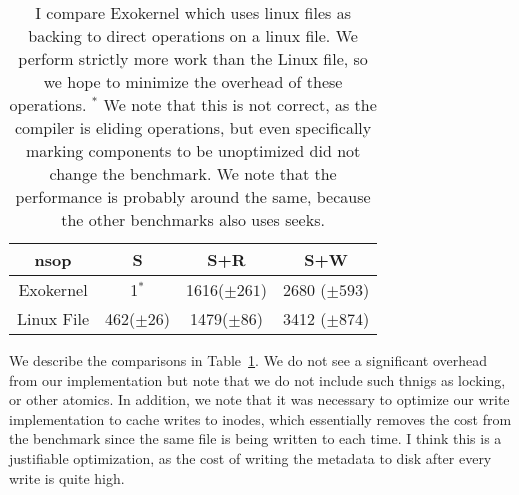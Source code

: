 \documentclass[letterpaper,twocolumn,10pt]{article}
\begin{document}
\begin{table}[t]
  \centering
  \begin{tabular}{|c|c|c|c|}
    ns\/op      & S      & S+R  & S+W \\
    \hline
    Exokernel  & 1$^{*}$& 1616($\pm 261$) & 2680 ($\pm 593$) \\
    \hline
    Linux File & 462($\pm 26$)    & 1479($\pm 86$) & 3412 ($\pm 874$) \\
  \end{tabular}
  \caption{
    \label{tab:cmp}
    I compare Exokernel which uses linux files as backing to direct operations on a linux file.
    We perform strictly more work than the Linux file, so we hope to minimize the overhead of
    these operations. $^*$ We note that this is not correct, as the compiler is
    eliding operations, but even specifically marking components to be unoptimized did not
    change the benchmark. We note that the performance is probably around the same, because
    the other benchmarks also uses seeks.
  }
\end{table}

We describe the comparisons in Table~\ref{tab:cmp}. We do not see a significant overhead from
our implementation but note that we do not include such thnigs as locking, or other atomics. In
addition, we note that it was necessary to optimize our write implementation to cache writes to
inodes, which essentially removes the cost from the benchmark since the same file is being
written to each time. I think this is a justifiable optimization, as the cost of writing the
metadata to disk after every write is quite high.



\end{document}
